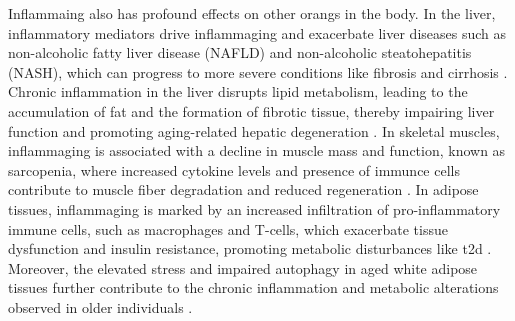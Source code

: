 \par Inflammaing also has profound effects on other orangs in the body. In the liver, inflammatory mediators drive inflammaging and exacerbate liver diseases such as non-alcoholic fatty liver disease (NAFLD) and non-alcoholic steatohepatitis (NASH), which can progress to more severe conditions like fibrosis and cirrhosis \textbf{\cite{jorquera_inflammaging_2022,li_inflammation_2023}}. Chronic inflammation in the liver disrupts lipid metabolism, leading to the accumulation of fat and the formation of fibrotic tissue, thereby impairing liver function and promoting aging-related hepatic degeneration \textbf{\cite{chung_advances_2021}}. In skeletal muscles, inflammaging is associated with a decline in muscle mass and function, known as sarcopenia, where increased cytokine levels and presence of immunce cells contribute to muscle fiber degradation and reduced regeneration \textbf{\cite{jorquera_inflammaging_2022,antuna_inflammaging_2022,jimenez-gutierrez_molecular_2022}}. In adipose tissues, inflammaging is marked by an increased infiltration of pro-inflammatory immune cells, such as macrophages and T-cells, which exacerbate tissue dysfunction and insulin resistance, promoting metabolic disturbances like \gls{t2d} \textbf{\cite{zamboni_how_2021}}. Moreover, the elevated  stress and impaired autophagy in aged white adipose tissues further contribute to the chronic inflammation and metabolic alterations observed in older individuals \textbf{\cite{ghosh_impaired_2016}}. 






